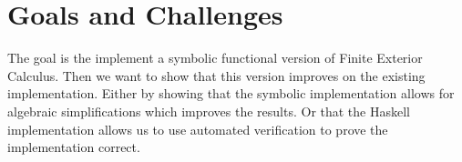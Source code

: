 \documentclass{scrartcl}
\begin{document}









\section{Goals and Challenges}



The goal is the implement a symbolic functional version of Finite Exterior
Calculus.
Then we want to show that this version improves on the existing implementation.
Either by showing that the symbolic implementation allows for algebraic
simplifications which improves the results. Or that the Haskell implementation
allows us to use automated verification to prove the implementation correct.

\end{document}
